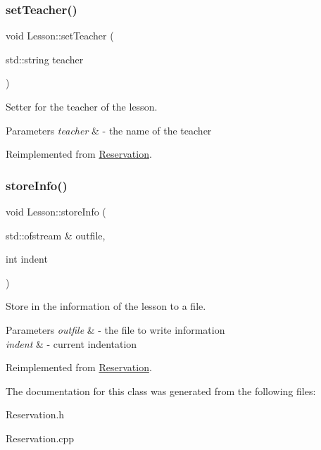 \mbox{\label{class_lesson_acbfde853aea74c9f2a3a6d50a4812705}} 
\subsubsection{\texorpdfstring{set\+Teacher()}{setTeacher()}}
{\footnotesize\ttfamily void Lesson\+::set\+Teacher (\begin{DoxyParamCaption}\item[{std\+::string}]{teacher }\end{DoxyParamCaption})\hspace{0.3cm}{\ttfamily [virtual]}}



Setter for the teacher of the lesson. 


\begin{DoxyParams}{Parameters}
{\em teacher} & -\/ the name of the teacher \\
\hline
\end{DoxyParams}


Reimplemented from \mbox{\hyperlink{class_reservation_afa8eadd14292a52c6a404078690a7f87}{Reservation}}.

\mbox{\label{class_lesson_a645855060ab3c915a6e0875bc5584887}} 
\subsubsection{\texorpdfstring{store\+Info()}{storeInfo()}}
{\footnotesize\ttfamily void Lesson\+::store\+Info (\begin{DoxyParamCaption}\item[{std\+::ofstream \&}]{outfile,  }\item[{int}]{indent }\end{DoxyParamCaption})\hspace{0.3cm}{\ttfamily [virtual]}}



Store in the information of the lesson to a file. 


\begin{DoxyParams}{Parameters}
{\em outfile} & -\/ the file to write information \\
\hline
{\em indent} & -\/ current indentation \\
\hline
\end{DoxyParams}


Reimplemented from \mbox{\hyperlink{class_reservation_a8ec83fe2eb15294c3a51a9998ed17df7}{Reservation}}.



The documentation for this class was generated from the following files\+:\begin{DoxyCompactItemize}
\item 
Reservation.\+h\item 
Reservation.\+cpp\end{DoxyCompactItemize}
